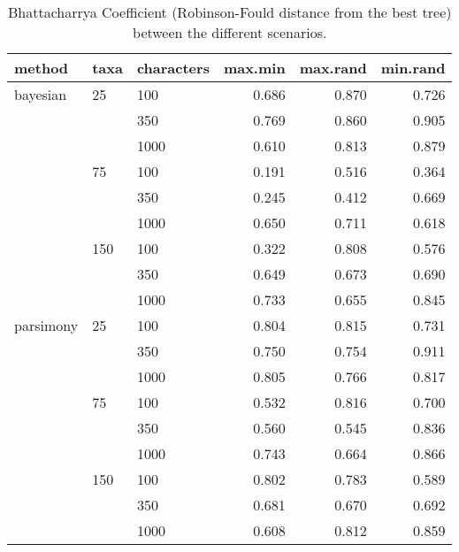 \begin{table}[ht]
\centering
\begin{tabular}{lllrrr}
  \hline
method & taxa & characters & max.min & max.rand & min.rand \\ 
  \hline
bayesian & 25 & 100 & 0.686 & 0.870 & 0.726 \\ 
   &  & 350 & 0.769 & 0.860 & 0.905 \\ 
   &  & 1000 & 0.610 & 0.813 & 0.879 \\ 
   & 75 & 100 & 0.191 & 0.516 & 0.364 \\ 
   &  & 350 & 0.245 & 0.412 & 0.669 \\ 
   &  & 1000 & 0.650 & 0.711 & 0.618 \\ 
   & 150 & 100 & 0.322 & 0.808 & 0.576 \\ 
   &  & 350 & 0.649 & 0.673 & 0.690 \\ 
   &  & 1000 & 0.733 & 0.655 & 0.845 \\ 
  parsimony & 25 & 100 & 0.804 & 0.815 & 0.731 \\ 
   &  & 350 & 0.750 & 0.754 & 0.911 \\ 
   &  & 1000 & 0.805 & 0.766 & 0.817 \\ 
   & 75 & 100 & 0.532 & 0.816 & 0.700 \\ 
   &  & 350 & 0.560 & 0.545 & 0.836 \\ 
   &  & 1000 & 0.743 & 0.664 & 0.866 \\ 
   & 150 & 100 & 0.802 & 0.783 & 0.589 \\ 
   &  & 350 & 0.681 & 0.670 & 0.692 \\ 
   &  & 1000 & 0.608 & 0.812 & 0.859 \\ 
   \hline
\end{tabular}
\caption{Bhattacharrya Coefficient (Robinson-Fould distance from the best tree) between the different scenarios.} 
\label{Full_Tab_BCRFbest}
\end{table}

